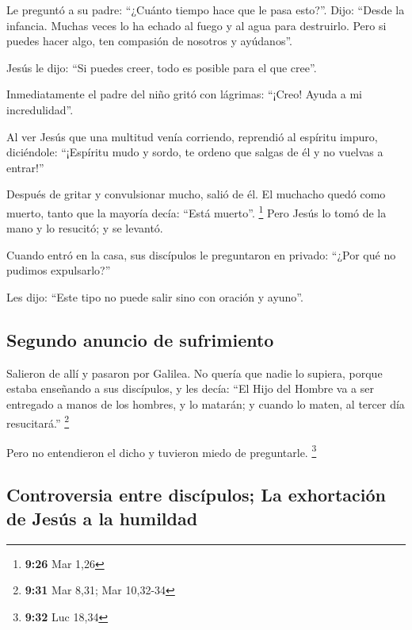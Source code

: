\begin{paracol}{2}
 Le preguntó a su padre: ``¿Cuánto tiempo hace que le
pasa esto?''. Dijo: ``Desde la infancia.  Muchas veces lo
ha echado al fuego y al agua para destruirlo. Pero si puedes hacer algo,
ten compasión de nosotros y ayúdanos''.

 Jesús le dijo: ``Si puedes creer, todo es posible para
el que cree''.

 Inmediatamente el padre del niño gritó con lágrimas:
``¡Creo! Ayuda a mi incredulidad''.

 Al ver Jesús que una multitud venía corriendo, reprendió
al espíritu impuro, diciéndole: ``¡Espíritu mudo y sordo, te ordeno que
salgas de él y no vuelvas a entrar!''

 Después de gritar y convulsionar mucho, salió de él. El
muchacho quedó como muerto, tanto que la mayoría decía: ``Está muerto''.
\footnote{\textbf{9:26} Mar 1,26}  Pero Jesús lo tomó de
la mano y lo resucitó; y se levantó.

 Cuando entró en la casa, sus discípulos le preguntaron
en privado: ``¿Por qué no pudimos expulsarlo?''

 Les dijo: ``Este tipo no puede salir sino con oración y
ayuno''.

\hypertarget{segundo-anuncio-de-sufrimiento}{%
\subsection{Segundo anuncio de
sufrimiento}\label{segundo-anuncio-de-sufrimiento}}

 Salieron de allí y pasaron por Galilea. No quería que
nadie lo supiera,  porque estaba enseñando a sus
discípulos, y les decía: ``El Hijo del Hombre va a ser entregado a manos
de los hombres, y lo matarán; y cuando lo maten, al tercer día
resucitará.'' \footnote{\textbf{9:31} Mar 8,31; Mar 10,32-34}

 Pero no entendieron el dicho y tuvieron miedo de
preguntarle. \footnote{\textbf{9:32} Luc 18,34}

\hypertarget{controversia-entre-discuxedpulos-la-exhortaciuxf3n-de-jesuxfas-a-la-humildad}{%
\subsection{Controversia entre discípulos; La exhortación de Jesús a la
humildad}\label{controversia-entre-discuxedpulos-la-exhortaciuxf3n-de-jesuxfas-a-la-humildad}}


\end{paracol}
